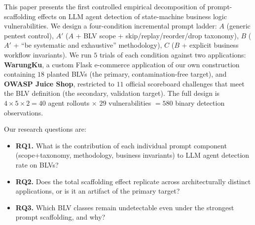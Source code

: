 \documentclass[conference]{IEEEtran}
\begin{document}
This paper presents the first controlled empirical decomposition of prompt-scaffolding effects on LLM agent detection of state-machine business logic vulnerabilities. We design a four-condition incremental prompt ladder: $A$ (generic pentest control), $A'$ ($A$ + BLV scope + skip/replay/reorder/drop taxonomy), $B$ ($A'$ + ``be systematic and exhaustive'' methodology), $C$ ($B$ + explicit business workflow invariants). We run $5$ trials of each condition against two applications: \textbf{WarungKu}, a custom Flask e-commerce application of our own construction containing $18$ planted BLVs (the primary, contamination-free target), and \textbf{OWASP Juice Shop}, restricted to $11$ official scoreboard challenges that meet the BLV definition (the secondary, validation target). The full design is $4 \times 5 \times 2 = 40$ agent rollouts $\times$ $29$ vulnerabilities $= 580$ binary detection observations.

Our research questions are:
\begin{itemize}
    \item \textbf{RQ1.} What is the contribution of each individual prompt component (scope+taxonomy, methodology, business invariants) to LLM agent detection rate on BLVs?
    \item \textbf{RQ2.} Does the total scaffolding effect replicate across architecturally distinct applications, or is it an artifact of the primary target?
    \item \textbf{RQ3.} Which BLV classes remain undetectable even under the strongest prompt scaffolding, and why?
\end{itemize}
\end{document}
